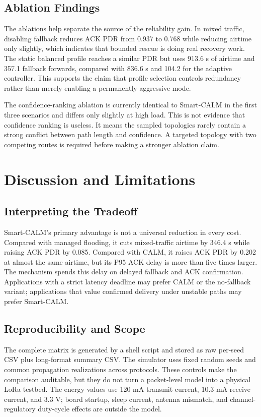 \documentclass[10pt,conference,letterpaper]{IEEEtran}
\begin{document}
\subsection{Ablation Findings}

The ablations help separate the source of the reliability gain. In mixed
traffic, disabling fallback reduces ACK PDR from 0.937 to 0.768 while
reducing airtime only slightly, which indicates that bounded rescue is doing
real recovery work. The static balanced profile reaches a similar PDR but uses
913.6 s of airtime and 357.1 fallback forwards, compared with 836.6 s and
104.2 for the adaptive controller. This supports the claim that profile
selection controls redundancy rather than merely enabling a permanently
aggressive mode.


The confidence-ranking ablation is currently identical to Smart-CALM in the
first three scenarios and differs only slightly at high load. This is not
evidence that confidence ranking is useless. It means the sampled topologies
rarely contain a strong conflict between path length and confidence. A targeted
topology with two competing routes is required before making a stronger
ablation claim.


\section{Discussion and Limitations}

\subsection{Interpreting the Tradeoff}

Smart-CALM's primary advantage is not a universal reduction in every cost.
Compared with managed flooding, it cuts mixed-traffic airtime by 346.4 s while
raising ACK PDR by 0.085. Compared with CALM, it raises ACK PDR by 0.202 at
almost the same airtime, but its P95 ACK delay is more than five times larger.
The mechanism spends this delay on delayed fallback and ACK confirmation.
Applications with a strict latency deadline may prefer CALM or the no-fallback
variant; applications that value confirmed delivery under unstable paths may
prefer Smart-CALM.


\subsection{Reproducibility and Scope}

The complete matrix is generated by a shell script and stored as raw
per-seed CSV plus long-format summary CSV. The simulator uses fixed random
seeds and common propagation realizations across protocols. These controls make
the comparison auditable, but they do not turn a packet-level model into a
physical LoRa testbed. The energy values use 120 mA transmit current, 10.3 mA
receive current, and 3.3 V; board startup, sleep current, antenna mismatch,
and channel-regulatory duty-cycle effects are outside the model.
\end{document}
